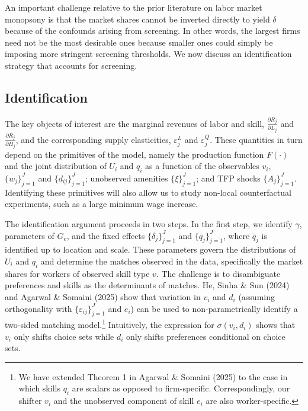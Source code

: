 \documentclass[11pt]{article}
\begin{document}
An important challenge relative to the prior literature on labor market monopsony is that the market shares cannot be inverted directly to yield $\delta$ because of the confounds arising from screening. In other words, the largest firms need not be the most desirable ones because smaller ones could simply be imposing more stringent screening thresholds. We now discuss an identification strategy that accounts for screening.

\subsection{Identification}

The key objects of interest are the marginal revenues of labor and skill, $\frac{\partial R_j}{\partial L_j}$ and $\frac{\partial R_j}{\partial H_j}$, and the corresponding supply elasticities, $\varepsilon_j^L$ and $\varepsilon_j^Q$. These quantities in turn depend on the primitives of the model, namely the production function $F(\cdot)$ and the joint distribution of $U_i$ and $q_i$ as a function of the observables $v_i$, $\{w_j\}_{j=1}^J$ and $\{d_{ij}\}_{j=1}^J$; unobserved amenities $\{\xi\}_{j=1}^J$; and TFP shocks $\{A_j\}_{j=1}^J$. Identifying these primitives will also allow us to study non-local counterfactual experiments, such as a large minimum wage increase.

The identification argument proceeds in two steps. In the first step, we identify $\gamma$, parameters of $G_e$, and the fixed effects $\{\delta_j\}_{j=1}^J$ and $\{\bar q_j\}_{j=1}^J$, where $\bar q_j$ is identified up to location and scale. These parameters govern the distributions of $U_i$ and $q_i$ and determine the matches observed in the data, specifically the market shares for workers of observed skill type $v$. The challenge is to disambiguate preferences and skills as the determinants of matches. He, Sinha \& Sun (2024) and Agarwal \& Somaini (2025) show that variation in $v_i$ and $d_i$ (assuming orthogonality with $\{\varepsilon_{ij}\}_{j=1}^J$ and $e_i$) can be used to non-parametrically identify a two-sided matching model.\footnote{We have extended Theorem 1 in Agarwal \& Somaini (2025) to the case in which skills $q_i$ are scalars as opposed to firm-specific.
Correspondingly, our shifter $v_i$ and the unobserved component of skill $e_i$ are also worker-specific.} Intuitively, the expression for $\sigma(v_i,d_i)$ shows that $v_i$ only shifts choice sets while $d_i$ only shifts preferences conditional on choice sets.
\end{document}
